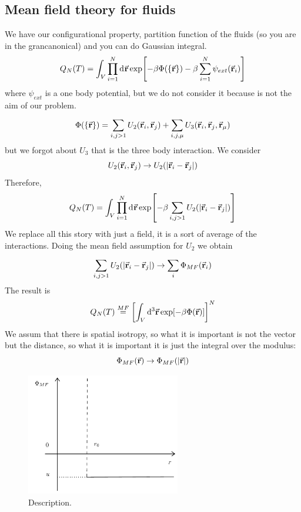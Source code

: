 \documentclass[../main/main.tex]{subfiles}
\begin{document}
\subsection{Mean field theory for fluids}
We have our configurational property, partition function of the fluids (so you are in the grancanonical) and you can do Gaussian integral.
\begin{equation}
  Q_N (T) = \int_{V}^{} \prod_{i=1}^{N}  \dd[]{\va{r}}  \exp [-\beta \Phi (\{ \va{r} \}  ) - \beta \sum_{i=1}^{N} \psi _{ext}  (\va{r}_i)]
\end{equation}
where \( \psi _{ext} \) is a one body potential, but we do not consider it because is not the aim of our problem.
\begin{equation}
  \Phi (\{ \va{r} \}  ) = \sum_{i,j>1}^{}  U_2 (\va{r}_i,\va{r}_j) + \sum_{i,j, \mu }^{} U_3 (\va{r}_i, \va{r}_j, \va{r}_ \mu )
\end{equation}
but we forgot about \( U_3 \) that is the three body interaction. We consider
\begin{equation}
   U_2 (\va{r}_i,\va{r}_j) \rightarrow U_2 ( \abs{\va{r}_i - \va{r}_j} )
\end{equation}
Therefore,
\begin{equation}
  Q_N (T) = \int_{V}^{} \prod_{i=1}^{N}  \dd[]{\va{r}}  \exp [-\beta \sum_{i,j > 1 }^{}  U_2 ( \abs{\va{r}_i - \va{r}_j} ) ]
\end{equation}
We replace all this story with just a field, it is a sort of average of the interactions. Doing the mean field assumption for \( U_2 \) we obtain
\begin{equation}
  \sum_{i,j > 1 }^{}  U_2 ( \abs{\va{r}_i - \va{r}_j} ) \rightarrow \sum_{i}^{} \Phi _{MF} (\va{r}_i)
\end{equation}
The result is
\begin{equation}
    Q_N (T) \overset{MF}{=}  \qty[\int_{V}^{}  \dd[3]{\va{r}}  \exp [-\beta \Phi (\va{r}) ] ]^N
\end{equation}
We assum that there is spatial isotropy, so what it is important is not the vector but the distance, so what it is important it is just the integral over the modulus:
\begin{equation}
  \Phi _{MF} (\va{r}) \rightarrow \Phi _{MF} (\abs{\va{r}} )
\end{equation}

\begin{figure}[h!]
\centering
\includegraphics[width=0.6\textwidth]{../lessons/14_image/1.pdf}
\caption{\label{fig:} Description.}
\end{figure}
\end{document}
